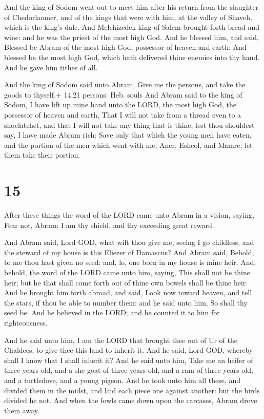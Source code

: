  And the king of Sodom went out to meet him after his
return from the slaughter of Chedorlaomer, and of the kings that were
with him, at the valley of Shaveh, which is the king's dale.
 And Melchizedek king of Salem brought forth bread and
wine: and he was the priest of the most high God.  And he
blessed him, and said, Blessed be Abram of the most high God, possessor
of heaven and earth:  And blessed be the most high God,
which hath delivered thine enemies into thy hand. And he gave him tithes
of all.

 And the king of Sodom said unto Abram, Give me the
persons, and take the goods to thyself.+ 14.21 persons: Heb. souls
 And Abram said to the king of Sodom, I have lift up mine
hand unto the LORD, the most high God, the possessor of heaven and
earth,  That I will not take from a thread even to a
shoelatchet, and that I will not take any thing that is thine, lest thou
shouldest say, I have made Abram rich:  Save only that
which the young men have eaten, and the portion of the men which went
with me, Aner, Eshcol, and Mamre; let them take their portion.

\hypertarget{section-14}{%
\section{15}\label{section-14}}

 After these things the word of the LORD came unto Abram in
a vision, saying, Fear not, Abram: I am thy shield, and thy exceeding
great reward.

 And Abram said, Lord GOD, what wilt thou give me, seeing I
go childless, and the steward of my house is this Eliezer of Damascus?
 And Abram said, Behold, to me thou hast given no seed: and,
lo, one born in my house is mine heir.  And, behold, the
word of the LORD came unto him, saying, This shall not be thine heir;
but he that shall come forth out of thine own bowels shall be thine
heir.  And he brought him forth abroad, and said, Look now
toward heaven, and tell the stars, if thou be able to number them: and
he said unto him, So shall thy seed be.  And he believed in
the LORD; and he counted it to him for righteousness.

 And he said unto him, I am the LORD that brought thee out
of Ur of the Chaldees, to give thee this land to inherit it.
 And he said, Lord GOD, whereby shall I know that I shall
inherit it?  And he said unto him, Take me an heifer of
three years old, and a she goat of three years old, and a ram of three
years old, and a turtledove, and a young pigeon.  And he
took unto him all these, and divided them in the midst, and laid each
piece one against another: but the birds divided he not. 
And when the fowls came down upon the carcases, Abram drove them away.

